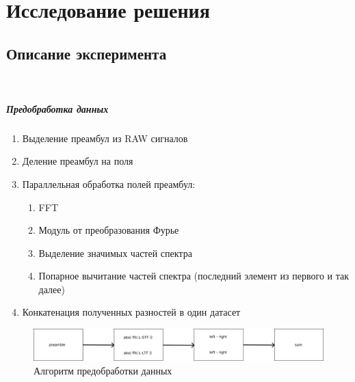 \chapter{Исследование решения}
\label{chap:research}

    \section{Описание эксперимента} \\ 
        \paragraph{Предобработка данных}
        \noindent 
        
        \noindent
        \begin{enumerate}
            \item Выделение преамбул из RAW сигналов
            \item Деление преамбул на поля
            \item Параллельная обработка полей преамбул:
            \begin{enumerate}
                \item FFT
                \item Модуль от преобразования Фурье
                \item Выделение значимых частей спектра
                \item Попарное вычитание частей спектра (последний элемент из первого и так далее)
            \end{enumerate}
            \item Конкатенация полученных разностей в один датасет
            \end{enumerate} 
            \begin{figure}[h!]
                \centering
                \includegraphics[scale=0.5]{pictures/algh.png}
                \caption{Алгоритм предобработки данных}
                \label{fig:my_label}
            \end{figure} 
